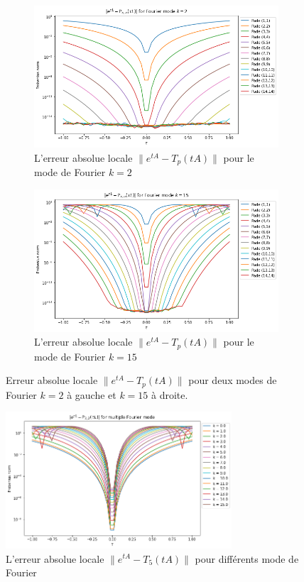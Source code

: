 \begin{figure}
  \begin{subfigure}{.5\textwidth}
    \centering
    \includegraphics[width=\textwidth]{img/approx_errortA2P.png}
    \caption{L'erreur absolue locale $\|e^{tA}-T_p(tA)\|$ pour le mode de Fourier $k=2$}
  \end{subfigure}
  \begin{subfigure}{.5\textwidth}
    \centering
    \includegraphics[width=\textwidth]{img/approx_errortA15P.png}
    \caption{L'erreur absolue locale $\|e^{tA}-T_p(tA)\|$ pour le mode de Fourier $k=15$}
  \end{subfigure}
  \caption{Erreur absolue locale $\|e^{tA}-T_p(tA)\|$ pour deux modes de Fourier $k=2$ à gauche et $k=15$ à droite.}
\end{figure}

\begin{figure}
  \centering
  \includegraphics[width=0.75\textwidth]{img/approx_errortAkP22.png}
  \caption{L'erreur absolue locale $\|e^{tA}-T_5(tA)\|$ pour différents mode de Fourier}
\end{figure}


